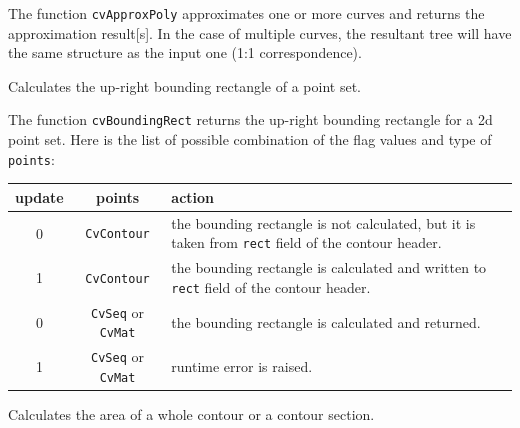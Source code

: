 The function \texttt{cvApproxPoly} approximates one or more curves and
returns the approximation result[s]. In the case of multiple curves,
the resultant tree will have the same structure as the input one (1:1
correspondence).

\label{BoundingRect}

Calculates the up-right bounding rectangle of a point set.


\begin{description}
\end{description}

The function \texttt{cvBoundingRect} returns the up-right bounding rectangle for a 2d point set.
Here is the list of possible combination of the flag values and type of \texttt{points}:

\begin{tabular}{|c|c|p{3in}|}
\hline
update & points & action \\ \hline
0 & \texttt{CvContour\*} & the bounding rectangle is not calculated, but it is taken from \texttt{rect} field of the contour header.\\ \hline
1 & \texttt{CvContour\*} & the bounding rectangle is calculated and written to \texttt{rect} field of the contour header.\\ \hline
0 & \texttt{CvSeq\*} or \texttt{CvMat\*} & the bounding rectangle is calculated and returned.\\ \hline
1 & \texttt{CvSeq\*} or \texttt{CvMat\*} & runtime error is raised.\\ \hline
\end{tabular}

\label{ContourArea}

Calculates the area of a whole contour or a contour section.


\begin{description}
\end{description}

